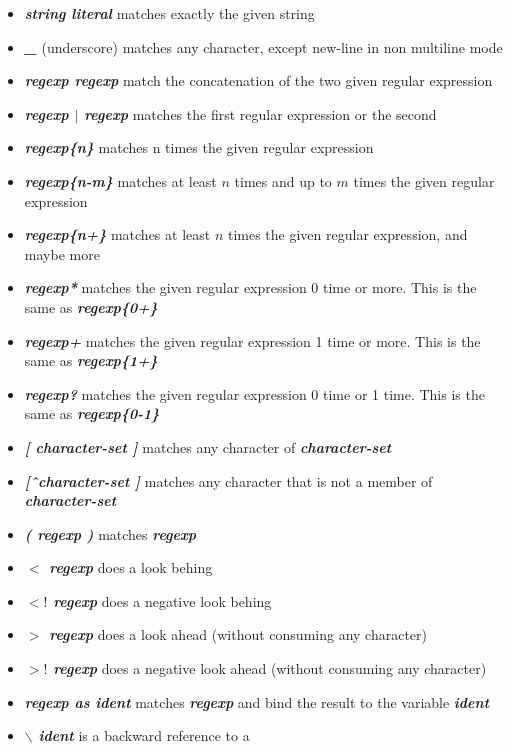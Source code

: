 \documentclass{article}
\begin{document}
\begin{itemize}
\item \textbf{\emph{string literal}} matches exactly the given string
\item \textbf{\emph{\_}} (underscore) matches any character, except
  new-line in non multiline mode
\item \textbf{\emph{regexp regexp}} match the concatenation of the two
  given regular expression
\item \textbf{\emph{regexp $\mid$ regexp}} matches the first regular
  expression or the second
\item \textbf{\emph{regexp\{n\}}} matches n times the given regular
  expression
\item \textbf{\emph{regexp\{n-m\}}} matches at least $n$ times and up to
  $m$ times the given regular expression
\item \textbf{\emph{regexp\{n+\}}} matches at least $n$ times the given
  regular expression, and maybe more
\item \textbf{\emph{regexp*}} matches the given regular expression 0
  time or more. This is the same as \textbf{\emph{regexp\{0+\}}}
\item \textbf{\emph{regexp+}} matches the given regular expression 1
  time or more. This is the same as \textbf{\emph{regexp\{1+\}}}
\item \textbf{\emph{regexp?}} matches the given regular expression 0
  time or 1 time. This is the same as \textbf{\emph{regexp\{0-1\}}}
\item \textbf{\emph{[ character-set ]}} matches any character of
  \textbf{\emph{character-set}}
\item \textbf{\emph{[\^\ character-set ]}} matches any character that
  is not a member of \textbf{\emph{character-set}}
\item \textbf{\emph{( regexp )}} matches \textbf{\emph{regexp}}
\item \textbf{\emph{$<$ regexp}} does a look behing
\item \textbf{\emph{$<!$ regexp}} does a negative look behing
\item \textbf{\emph{$>$ regexp}} does a look ahead (without consuming any character)
\item \textbf{\emph{$>!$ regexp}} does a negative look ahead (without consuming any character)
\item \textbf{\emph{regexp as ident}} matches \textbf{\emph{regexp}}
  and bind the result to the variable \textbf{\emph{ident}}
\item \textbf{\emph{$\backslash$ ident}} is a backward reference to a

\end{itemize}
\end{document}
